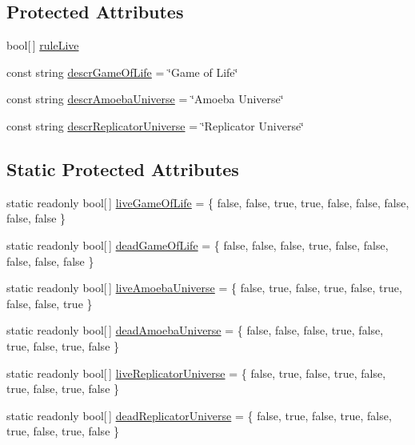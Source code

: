 \subsection*{Protected Attributes}
\begin{DoxyCompactItemize}
\item 
bool\mbox{[}$\,$\mbox{]} \hyperlink{class_cellular_1_1_totalistic2_d_automaton_a4752e3402c58243f7f342e21ddad3b05}{rule\+Live}
\item 
const string \hyperlink{class_cellular_1_1_totalistic2_d_automaton_a925e29c85ea53754a86864aa9b2e27f9}{descr\+Game\+Of\+Life} = \char`\"{}Game of Life\char`\"{}
\item 
const string \hyperlink{class_cellular_1_1_totalistic2_d_automaton_a0acaeddabe1e121966d99d9144eb3220}{descr\+Amoeba\+Universe} = \char`\"{}Amoeba Universe\char`\"{}
\item 
const string \hyperlink{class_cellular_1_1_totalistic2_d_automaton_ab93b5f3ae4587498fcccab5a77992ab9}{descr\+Replicator\+Universe} = \char`\"{}Replicator Universe\char`\"{}
\end{DoxyCompactItemize}
\subsection*{Static Protected Attributes}
\begin{DoxyCompactItemize}
\item 
static readonly bool\mbox{[}$\,$\mbox{]} \hyperlink{class_cellular_1_1_totalistic2_d_automaton_a4633d221a98d2f36cc876f5a08c61f1e}{live\+Game\+Of\+Life} = \{ false, false, true, true, false, false, false, false, false \}
\item 
static readonly bool\mbox{[}$\,$\mbox{]} \hyperlink{class_cellular_1_1_totalistic2_d_automaton_aa4888d1ead2dfcdb1c90c79485aed255}{dead\+Game\+Of\+Life} = \{ false, false, false, true, false, false, false, false, false \}
\item 
static readonly bool\mbox{[}$\,$\mbox{]} \hyperlink{class_cellular_1_1_totalistic2_d_automaton_a69f67fbf81c8a2c5a3700c4f9b55c596}{live\+Amoeba\+Universe} = \{ false, true, false, true, false, true, false, false, true \}
\item 
static readonly bool\mbox{[}$\,$\mbox{]} \hyperlink{class_cellular_1_1_totalistic2_d_automaton_a5b2dd1d361797410beda7ea765b40c31}{dead\+Amoeba\+Universe} = \{ false, false, false, true, false, true, false, true, false \}
\item 
static readonly bool\mbox{[}$\,$\mbox{]} \hyperlink{class_cellular_1_1_totalistic2_d_automaton_abb59a96261e32abc500ce4c7db88cdd6}{live\+Replicator\+Universe} = \{ false, true, false, true, false, true, false, true, false \}
\item 
static readonly bool\mbox{[}$\,$\mbox{]} \hyperlink{class_cellular_1_1_totalistic2_d_automaton_a195a2bf20843bbc0980979ef889170d3}{dead\+Replicator\+Universe} = \{ false, true, false, true, false, true, false, true, false \}
\end{DoxyCompactItemize}


